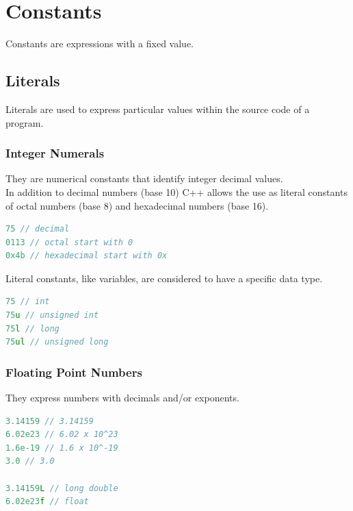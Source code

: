 \documentclass[12pt,oneside]{book}
\begin{document}
\section{Constants}
Constants are expressions with a fixed value.
\subsection{Literals}
Literals are used to express particular values within the source code of a program.
\subsubsection{Integer Numerals}
They are numerical constants that identify integer decimal values.\\
In addition to decimal numbers (base 10) C++ allows the use as literal constants of octal numbers (base 8) and hexadecimal numbers (base 16).
	\begin{lstlisting}[language=C++]
75 // decimal
0113 // octal start with 0
0x4b // hexadecimal start with 0x
\end{lstlisting}
Literal constants, like variables, are considered to have a specific data type.
	\begin{lstlisting}[language=C++]
75 // int
75u // unsigned int
75l // long
75ul // unsigned long
\end{lstlisting}
\subsubsection{Floating Point Numbers}
They express numbers with decimals and/or exponents.
	\begin{lstlisting}[language=C++]
3.14159 // 3.14159
6.02e23 // 6.02 x 10^23
1.6e-19 // 1.6 x 10^-19
3.0 // 3.0

3.14159L // long double
6.02e23f // float
\end{lstlisting}
\end{document}
